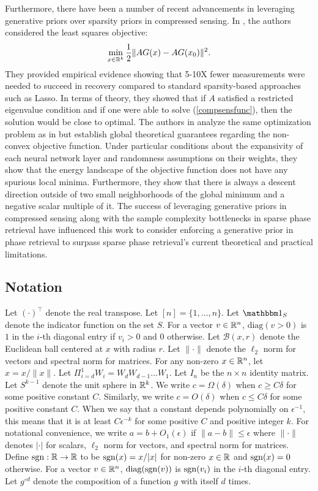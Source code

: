 \documentclass{article}
\begin{document}
Furthermore, there have been a number of recent advancements in leveraging generative priors over sparsity priors in compressed sensing. In \cite{Price2017}, the authors considered the least squares objective: \begin{align}
\min_{x \in \mathbb{R}^k} \frac{1}{2} \|AG(x) - AG(x_0)\|^2. \label{compsensfunc}
\end{align} They provided empirical evidence showing that 5-10X fewer measurements were needed to succeed in recovery compared to standard sparsity-based approaches such as Lasso. In terms of theory, they showed that if $A$ satisfied a restricted eigenvalue condition and if one were able to solve (\ref{compsensfunc}), then the solution would be close to optimal. The authors in \cite{Hand2017} analyze the same optimization problem as in \cite{Price2017} but establish global theoretical guarantees regarding the non-convex objective function. Under particular conditions about the expansivity of each neural network layer and randomness assumptions on their weights, they show that the energy landscape of the objective function does not have any spurious local minima. Furthermore, they show that there is always a descent direction outside of two small neighborhoods of the global minimum and a negative scalar multiple of it. The success of leveraging generative priors in compressed sensing along with the sample complexity bottlenecks in sparse phase retrieval have influenced this work to consider enforcing a generative prior in phase retrieval to surpass sparse phase retrieval's current theoretical and practical limitations.

\subsection{Notation}

Let $(\cdot)^\top$ denote the real transpose. Let $[n] = \{1,\dots,n\}$. Let $\one_{S}$ denote the indicator function on the set $S$. For a vector $v \in \mathbb{R}^n$, $\text{diag}(v > 0)$ is $1$ in the $i$-th diagonal entry if $v_i > 0$ and $0$ otherwise. Let $\mathcal{B}(x,r)$ denote the Euclidean ball centered at $x$ with radius $r$. Let $\|\cdot\|$ denote the $\ell_2$ norm for vectors and spectral norm for matrices. For any non-zero $x \in \mathbb{R}^n$, let $\hat{x} = x/\|x\|$. Let $\Pi_{i=d}^1 W_i = W_d W_{d-1} \dots W_1$. Let $I_n$ be the $n \times n$ identity matrix. Let $S^{k-1}$ denote the unit sphere in $\mathbb{R}^k$. We write $c = \Omega(\delta)$ when $c \geq C\delta$ for some positive constant $C$. Similarly, we write $c = O(\delta)$ when $c \leq C \delta$ for some positive constant $C$. When we say that a constant depends polynomially on $\epsilon^{-1}$, this means that it is at least $C \epsilon^{-k}$ for some positive $C$ and positive integer $k$. For notational convenience, we write $a = b + O_1(\epsilon)$ if $\|a - b\| \leq \epsilon$ where $\|\cdot\|$ denotes $|\cdot|$ for scalars, $\ell_2$ norm for vectors, and spectral norm for matrices. Define $\operatorname{sgn} : \mathbb{R} \rightarrow \mathbb{R}$ to be $\operatorname{sgn}(x) = x/|x|$ for non-zero $x \in \mathbb{R}$ and $\operatorname{sgn}(x) = 0$ otherwise. For a vector $v \in \mathbb{R}^n$, $\text{diag}(\operatorname{sgn}(v))$ is $\operatorname{sgn}(v_i)$ in the $i$-th diagonal entry. Let $g^{\circ d}$ denote the composition of a function $g$ with itself $d$ times.
\end{document}
